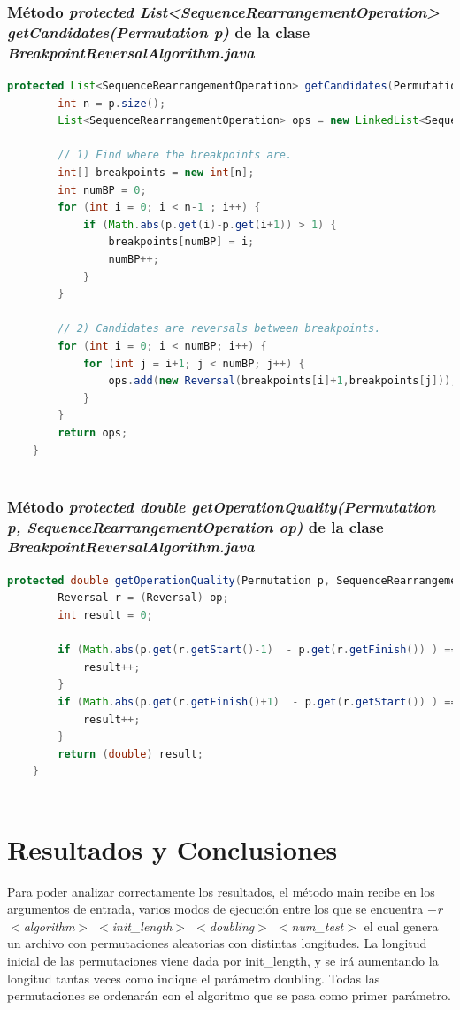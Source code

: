 \documentclass[11pt,letterpaper]{article}
\begin{document}
\subsubsection{Método \textit{protected List<SequenceRearrangementOperation> getCandidates(Permutation p)} de la clase \textit{BreakpointReversalAlgorithm.java}}\label{ch:32}
\begin{lstlisting}[language = java]
	protected List<SequenceRearrangementOperation> getCandidates(Permutation p) {
		int n = p.size();
		List<SequenceRearrangementOperation> ops = new LinkedList<SequenceRearrangementOperation>();
		
		// 1) Find where the breakpoints are.
		int[] breakpoints = new int[n];
		int numBP = 0;
		for (int i = 0; i < n-1 ; i++) {
			if (Math.abs(p.get(i)-p.get(i+1)) > 1) {				
				breakpoints[numBP] = i;
				numBP++;
			}
		}
			
		// 2) Candidates are reversals between breakpoints.
		for (int i = 0; i < numBP; i++) {
			for (int j = i+1; j < numBP; j++) {
				ops.add(new Reversal(breakpoints[i]+1,breakpoints[j]));				
			}
		}
		return ops;
	}
	
\end{lstlisting}

\subsubsection{Método \textit{protected double getOperationQuality(Permutation p, SequenceRearrangementOperation op)} de la clase \textit{BreakpointReversalAlgorithm.java}}\label{ch:33}
\begin{lstlisting}[language = java]
	protected double getOperationQuality(Permutation p, SequenceRearrangementOperation op) {
		Reversal r = (Reversal) op;
		int result = 0;
		
		if (Math.abs(p.get(r.getStart()-1)  - p.get(r.getFinish()) ) == 1) {
			result++;
		}
		if (Math.abs(p.get(r.getFinish()+1)  - p.get(r.getStart()) ) == 1) {
			result++;
		} 
		return (double) result;
	}
	
\end{lstlisting}


\section{Resultados y Conclusiones}
Para poder analizar correctamente los resultados, el método main recibe en los argumentos de entrada, varios modos de ejecución entre los que se encuentra \textit{$-$r $<$algorithm$>$ $<$init\_length$>$ $<$doubling$>$ $<$num\_test$>$} el cual genera un archivo con permutaciones aleatorias con distintas longitudes. La longitud inicial de las permutaciones viene dada por init\_length, y se irá aumentando la longitud tantas veces como indique el parámetro doubling. Todas las permutaciones se ordenarán con el algoritmo que se pasa como primer parámetro.
\end{document}
